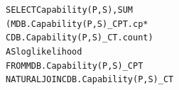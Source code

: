 \begin{alltt}
SELECT Capability(P,S),  SUM
(MDB.Capability(P,S)\_CPT.cp * \\CDB.Capability(P,S)\_CT.count) 
AS loglikelihood
FROM MDB.Capability(P,S)\_CPT 
NATURAL JOIN CDB.Capability(P,S)\_CT
\end{alltt}


%
%

